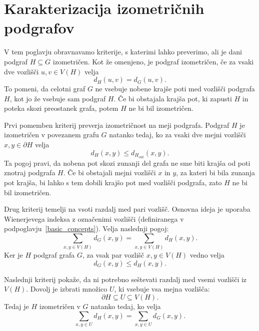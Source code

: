\documentclass[sigconf
]{acmart}
\theoremstyle{definition}
\begin{document}
\section{Karakterizacija izometričnih podgrafov \cite{main_paper}}

V tem poglavju obravnavamo kriterije, s katerimi lahko preverimo, ali je dani podgraf $H \subseteq G$ izometričen. Kot že omenjeno, je podgraf izometričen, če za vsaki dve vozlišči $u,v \in V(H)$ velja
\begin{equation}
    d_H(u, v) = d_G(u, v).
\end{equation}
To pomeni, da celotni graf $G$ ne vsebuje nobene krajše poti med vozlišči podgrafa $H$, kot jo že vsebuje sam podgraf $H$. Če bi obstajala krajša pot, ki zapusti $H$ in poteka skozi preostanek grafa, potem $H$ ne bi bil izometričen.



Prvi pomemben kriterij preverja izometričnost na meji podgrafa. Podgraf $H$ je izometričen v povezanem grafu $G$ natanko tedaj, ko za vsaki dve mejni vozlišči $x,y \in \partial H$ velja
\begin{equation}
    d_H(x,y) \leq d_{H_{\mathrm{out}}}(x,y).
\end{equation}
Ta pogoj pravi, da nobena pot skozi zunanji del grafa ne sme biti krajša od poti znotraj podgrafa $H$. Če bi obstajali mejni vozlišči $x$ in $y$, za kateri bi bila zunanja pot krajša, bi lahko s tem dobili krajšo pot med vozlišči podgrafa, zato $H$ ne bi bil izometričen.

Drug kriterij temelji na vsoti razdalj med pari vozlišč. Osnovna ideja je uporaba Wienerjevega indeksa z označenimi vozlišči (definiranega v podpoglavju~\ref{basic_concepts}). Velja naslednji pogoj:
\begin{equation}
    \sum_{x,y \in V(H)} d_G(x,y)
    =
    \sum_{x,y \in V(H)} d_H(x,y).
\end{equation}
Ker je $H$ podgraf grafa $G$, za vsak par vozlišč $x,y \in V(H)$ vedno velja
\begin{equation}
    d_G(x,y) \leq d_H(x,y).
\end{equation}

Naslednji kriterij pokaže, da ni potrebno seštevati razdalj med vsemi vozlišči iz $V(H)$. Dovolj je izbrati množico $U$, ki vsebuje vsa mejna vozlišča:
\begin{equation}
    \partial H \subseteq U \subseteq V(H).
\end{equation}
Tedaj je $H$ izometričen v $G$ natanko tedaj, ko velja
\begin{equation}
    \sum_{x,y \in U} d_H(x,y)
    =
    \sum_{x,y \in U} d_G(x,y).
\end{equation}
\end{document}
